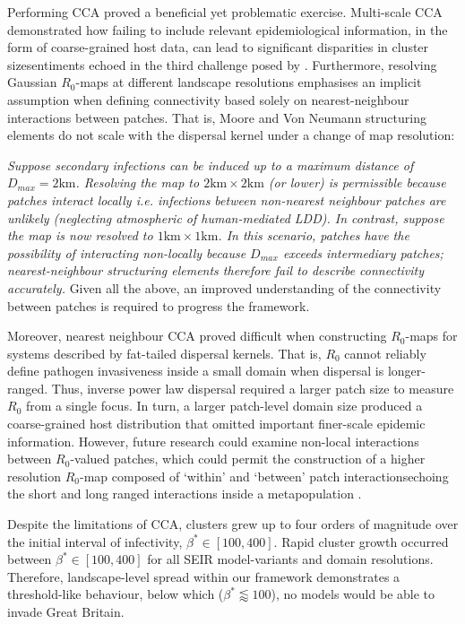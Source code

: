 Performing CCA proved a beneficial yet problematic exercise.
Multi-scale CCA demonstrated how failing to include relevant epidemiological information, in the form of coarse-grained host data, can lead to significant disparities in cluster size\textemdash sentiments echoed in the third challenge posed by \cite{13-challenges}.
Furthermore, resolving Gaussian $R_0$-maps at different landscape resolutions emphasises an implicit assumption when defining connectivity based solely on nearest-neighbour interactions between patches. 
That is, Moore and Von Neumann structuring elements do not scale with the dispersal kernel under a change of map resolution:

\textit{Suppose secondary infections can be induced up to a maximum distance of $D_{max} = 2\mathrm{km}$.
Resolving the map to $\mathrm{2km \times 2km}$ (or lower) is permissible because patches interact locally i.e. infections between non-nearest neighbour patches are unlikely (neglecting atmospheric of human-mediated LDD).
In contrast, suppose the map is now resolved to $\mathrm{1km \times 1km}$.
In this scenario, patches have the possibility of interacting non-locally because $D_{max}$ exceeds intermediary patches;
nearest-neighbour structuring elements therefore fail to describe connectivity accurately.}
Given all the above, an improved understanding of the connectivity between patches is required to progress the framework.

Moreover, nearest neighbour CCA proved difficult when constructing $R_0$-maps for systems described by fat-tailed dispersal kernels.
That is, $R_0$ cannot reliably define pathogen invasiveness inside a small domain when dispersal is longer-ranged.
Thus, inverse power law dispersal required a larger patch size to measure $R_0$ from a single focus. 
In turn, a larger patch-level domain size produced a coarse-grained host distribution that omitted important finer-scale epidemic information.
However, future research could examine non-local interactions between $R_0$-valued patches, which could permit the construction of a higher resolution $R_0$-map composed of `within' and `between' patch interactions\textemdash echoing 
the short and long ranged interactions inside a metapopulation \cite{beninca2020trade}.


Despite the limitations of CCA, clusters grew up to four orders of magnitude over the initial interval of infectivity, $\beta^*\in [100, 400]$. Rapid cluster growth occurred between $\beta^*\in [100, 400]$ for all SEIR model-variants and domain resolutions. Therefore, landscape-level spread within our framework demonstrates a threshold-like behaviour, below which ($\beta^* \lessapprox 100$), no models would be able to invade Great Britain. 

